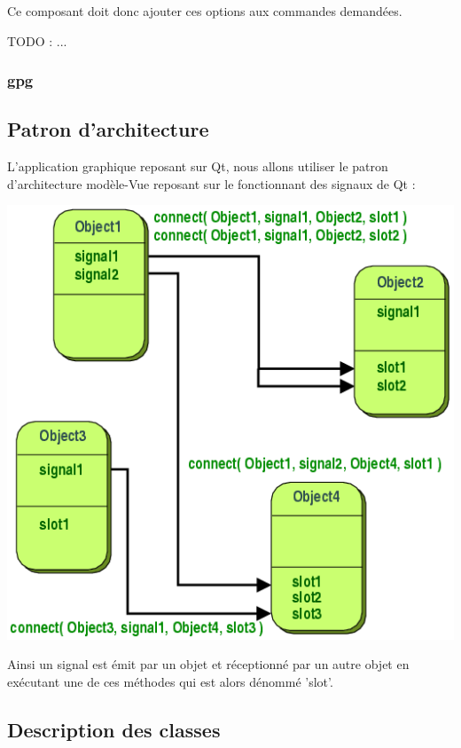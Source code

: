 \documentclass{../res/univ-projet}
\begin{document}
      Ce composant doit donc ajouter ces options aux commandes demandées.

      TODO : ...

    \subsubsection{gpg}

  \subsection{Patron d'architecture}

    L'application graphique reposant sur Qt, nous allons utiliser le patron d'architecture modèle-Vue
    reposant sur le fonctionnant des signaux de Qt :
    \begin{center}
    \includegraphics[scale=.5]{../res/MV.png}
    \end{center}

    Ainsi un signal est émit par un objet et réceptionné par un autre objet en exécutant une de ces méthodes
    qui est alors dénommé 'slot'.

  \subsection{Description des classes} %
      
\end{document}
